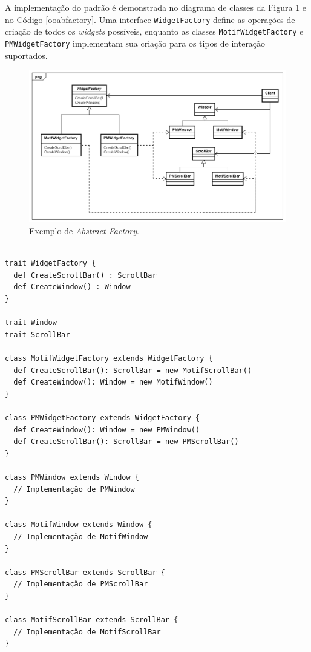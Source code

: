 A implementação do padrão é demonstrada no 
diagrama de classes da Figura \ref{abfactory_exemplo} 
e no Código \ref{ooabfactory}. Uma interface 
\texttt{WidgetFactory} define as operações de criação 
de todos os \textit{widgets} possíveis, enquanto 
as classes \texttt{MotifWidgetFactory} e \texttt{PMWidgetFactory} 
implementam sua criação para os tipos de 
interação suportados.

\begin{figure}[htb]
	\caption{\label{abfactory_exemplo}Exemplo de \textit{Abstract Factory}.}
	\begin{center}
	    \includegraphics[scale=0.5]{5_padroes-contexto-funcional/5.1_criacionais/5.1.2_abstract-factory/abstractfactory_exemplo.png}
	\end{center}
\end{figure}

\begin{lstlisting}[caption={Abstract Factory Orientado a Objetos.},label=ooabfactory]
	
trait WidgetFactory {
  def CreateScrollBar() : ScrollBar
  def CreateWindow() : Window
}

trait Window 
trait ScrollBar

class MotifWidgetFactory extends WidgetFactory {
  def CreateScrollBar(): ScrollBar = new MotifScrollBar()
  def CreateWindow(): Window = new MotifWindow()
}

class PMWidgetFactory extends WidgetFactory {
  def CreateWindow(): Window = new PMWindow()
  def CreateScrollBar(): ScrollBar = new PMScrollBar()
}

class PMWindow extends Window {
  // Implementação de PMWindow
}

class MotifWindow extends Window {
  // Implementação de MotifWindow
}

class PMScrollBar extends ScrollBar {
  // Implementação de PMScrollBar
}

class MotifScrollBar extends ScrollBar {
  // Implementação de MotifScrollBar
}

\end{lstlisting}



